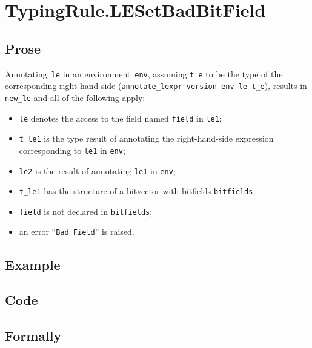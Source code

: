 \documentclass{book}
\begin{document}

\section{TypingRule.LESetBadBitField \label{sec:TypingRule.LESetBadBitField}}

    \subsection{Prose}
   Annotating~\texttt{le} in an environment~\texttt{env}, assuming
\texttt{t\_e} to be the type of the corresponding right-hand-side
(\texttt{annotate\_lexpr version env le t\_e}), results in \texttt{new\_le} and
all of the following apply:
   \begin{itemize}
   \item \texttt{le} denotes the access to the field named \texttt{field} in \texttt{le1};
   \item \texttt{t\_le1} is the type result of annotating the right-hand-side expression corresponding to \texttt{le1} in \texttt{env};
   \item \texttt{le2} is the result of annotating \texttt{le1} in \texttt{env};
   \item \texttt{t\_le1} has the structure of a bitvector with bitfields \texttt{bitfields};
   \item \texttt{field} is not declared in \texttt{bitfields};
   \item an error ``\texttt{Bad Field}'' is raised.
   \end{itemize}

  \subsection{Example}

  \subsection{Code}

\begin{emptyformal}
    \subsection{Formally}
\end{emptyformal}
\end{document}
